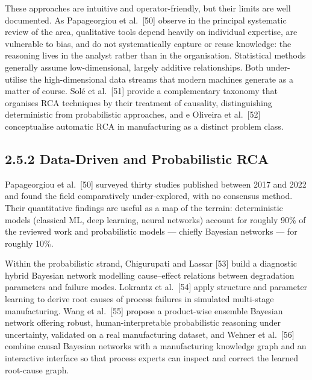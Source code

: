 These approaches are intuitive and operator-friendly, but their limits are well documented. As Papageorgiou et al.~{[}50{]} observe in the principal systematic review of the area, qualitative tools depend heavily on individual expertise, are vulnerable to bias, and do not systematically capture or reuse knowledge: the reasoning lives in the analyst rather than in the organisation. Statistical methods generally assume low-dimensional, largely additive relationships. Both under-utilise the high-dimensional data streams that modern machines generate as a matter of course. Solé et al.~{[}51{]} provide a complementary taxonomy that organises RCA techniques by their treatment of causality, distinguishing deterministic from probabilistic approaches, and e Oliveira et al.~{[}52{]} conceptualise automatic RCA in manufacturing as a distinct problem class.

\hypertarget{data-driven-and-probabilistic-rca}{%
\subsection{2.5.2 Data-Driven and Probabilistic RCA}\label{data-driven-and-probabilistic-rca}}

Papageorgiou et al.~{[}50{]} surveyed thirty studies published between 2017 and 2022 and found the field comparatively under-explored, with no consensus method. Their quantitative findings are useful as a map of the terrain: deterministic models (classical ML, deep learning, neural networks) account for roughly 90\% of the reviewed work and probabilistic models --- chiefly Bayesian networks --- for roughly 10\%.

Within the probabilistic strand, Chigurupati and Lassar {[}53{]} build a diagnostic hybrid Bayesian network modelling cause--effect relations between degradation parameters and failure modes. Lokrantz et al.~{[}54{]} apply structure and parameter learning to derive root causes of process failures in simulated multi-stage manufacturing. Wang et al.~{[}55{]} propose a product-wise ensemble Bayesian network offering robust, human-interpretable probabilistic reasoning under uncertainty, validated on a real manufacturing dataset, and Wehner et al.~{[}56{]} combine causal Bayesian networks with a manufacturing knowledge graph and an interactive interface so that process experts can inspect and correct the learned root-cause graph.

